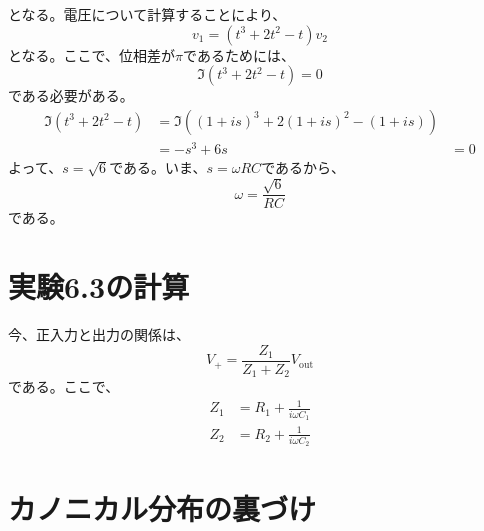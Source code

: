 \documentclass[a4paper,11pt]{jsarticle}
\numberwithin{equation}{section}
\begin{document}
となる。電圧について計算することにより、
\begin{equation}
  v_1 = (t^3+2t^2-t)v_2
\end{equation}
となる。ここで、位相差が$\pi$であるためには、
\begin{equation}
  \Im(t^3+2t^2-t) = 0
\end{equation}
である必要がある。
\begin{align}
  \Im(t^3+2t^2-t) &= \Im((1+is)^3+2(1+is)^2-(1+is))\\
  &= -s^3+6s
  &= 0
\end{align}
よって、$s = \sqrt{6}$である。いま、$s = \omega RC$であるから、
\begin{equation}
  \omega = \frac{\sqrt{6}}{RC}
\end{equation}
である。\\

\section{実験6.3の計算}
今、正入力と出力の関係は、
\begin{equation}
  V_{+} = \frac{Z_1}{Z_1+Z_2}V_{\text{out}}
\end{equation}
である。ここで、
\begin{align} 
  Z_1 &= R_1 + \frac{1}{i\omega C_1}\\
  Z_2 &= R_2 + \frac{1}{i\omega C_2}        
\end{align}


\section*{カノニカル分布の裏づけ}
\end{document}
